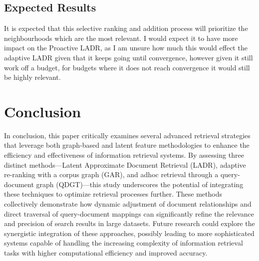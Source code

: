 \documentclass[sigconf,authorversion,nonacm]{acmart}
\begin{document}
\subsection{Expected Results}

It is expected that this selective ranking and addition process will prioritize the neighbourhoods
which are the most relevant. I would expect it to have more impact on the Proactive LADR, as I am
unsure how much this would effect the adaptive LADR given that it keeps going until convergence,
however given it still work off a budget, for budgets where it does not reach convergence it would
still be highly relevant.

\section{Conclusion}

In conclusion, this paper critically examines several advanced retrieval strategies that leverage
both graph-based and latent feature methodologies to enhance the efficiency and effectiveness of
information retrieval systems. By assessing three distinct methods—Latent Approximate Document
Retrieval (LADR), adaptive re-ranking with a corpus graph (GAR), and adhoc retrieval through a
query-document graph (QDGT)—this study underscores the potential of integrating these techniques to
optimize retrieval processes further. These methods collectively demonstrate how dynamic adjustment
of document relationships and direct traversal of query-document mappings can significantly refine
the relevance and precision of search results in large datasets. Future research could explore the
synergistic integration of these approaches, possibly leading to more sophisticated systems capable
of handling the increasing complexity of information retrieval tasks with higher computational
efficiency and improved accuracy.

\section*{}


\end{document}
